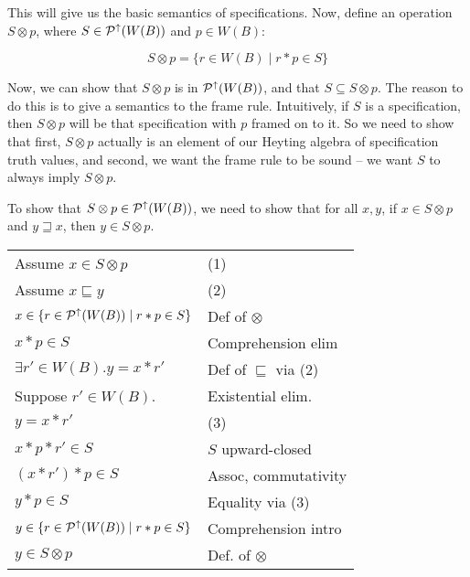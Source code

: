 This will give us the basic semantics of specifications. Now, define an 
operation $S \otimes p$, where $S \in \mathcal{P}^{\uparrow}({W(B}))$ and
$p \in W(B)$:

\begin{displaymath}
S \otimes p = \{ r \in W(B) \;|\; r * p \in S \}
\end{displaymath}

Now, we can show that $S \otimes p$ is in $\mathcal{P}^{\uparrow}({W(B}))$, and that 
$S \subseteq S \otimes p $. The reason to do this is to give a semantics
to the frame rule. Intuitively, if $S$ is a specification, then $S \otimes p$ 
will be that specification with $p$ framed on to it. So we need to show that
first, $S \otimes p$ actually is an element of our Heyting algebra of 
specification truth values, and second, we want the frame rule to be 
sound -- we want $S$ to always imply $S \otimes p$. 

To show that $S \otimes p \in \mathcal{P}^{\uparrow}({W(B)})$, we need to show that for all 
$x,y$, if $x \in S \otimes p$ and $y \sqsupseteq x$, then $y \in S \otimes p$. 
\\

\begin{tabular}{ll}
Assume $x \in S \otimes p$                          & (1) \\
Assume $x \sqsubseteq y$                            & (2) \\
$x \in \{ r \in \mathcal{P}^{\uparrow}({W(B)}) \;|\; r * p \in S \}$  & Def of $\otimes$ \\
$x * p \in S$                                       & Comprehension elim \\
$\exists r' \in W(B). y = x * r'$                            & Def of $\sqsubseteq$ via (2)\\
Suppose $r' \in W(B)$.                              & Existential elim. \\
$y = x * r'$                                        & (3) \\
$x * p * r' \in S$                                  & $S$ upward-closed \\
$(x * r') * p \in S$                                & Assoc, commutativity \\
$y * p \in S$                                       & Equality via (3) \\
$y \in \{r \in \mathcal{P}^{\uparrow}({W(B)}) \;|\; r * p \in S \}$   & Comprehension intro \\
$y \in S \otimes p$                                 & Def. of $\otimes$ \\
\end{tabular}
\\


